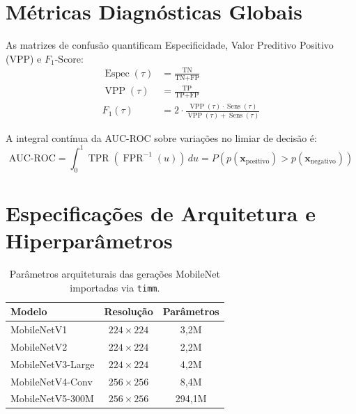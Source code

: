 \documentclass[oneside,english,brazilian]{UNISINOSmonografia}
\begin{document}
\section{Métricas Diagnósticas Globais}
\label{sec:apendice_metricas}

As matrizes de confusão quantificam Especificidade, Valor Preditivo Positivo (VPP) e $F_1$-Score:
\begin{align}
    \operatorname{Espec}(\tau) &= \frac{\text{TN}}{\text{TN} + \text{FP}} \\
    \operatorname{VPP}(\tau) &= \frac{\text{TP}}{\text{TP} + \text{FP}} \\
    F_1(\tau) &= 2 \cdot \frac{\operatorname{VPP}(\tau) \cdot \operatorname{Sens}(\tau)}{\operatorname{VPP}(\tau) + \operatorname{Sens}(\tau)}
\end{align}

A integral contínua da AUC-ROC sobre variações no limiar de decisão é:
\begin{equation}
    \label{eq:apendice_auc_roc}
    \text{AUC-ROC} = \int_{0}^{1} \operatorname{TPR}\left(\operatorname{FPR}^{-1}(u)\right) \, du = P\left(p(\mathbf{x}_{\text{positivo}}) > p(\mathbf{x}_{\text{negativo}})\right)
\end{equation}

\section{Especificações de Arquitetura e Hiperparâmetros}
\label{sec:apendice_tabelas}

\begin{table}[H]
    \centering
    \caption{Parâmetros arquiteturais das gerações MobileNet importadas via \texttt{timm}.}
    \label{tab:apendice_arquiteturas}
    \begin{tabular}{lcc}
        \toprule
        \textbf{Modelo} & \textbf{Resolução} & \textbf{Parâmetros} \\
        \midrule
        MobileNetV1 & $224 \times 224$ & 3,2M \\
        MobileNetV2 & $224 \times 224$ & 2,2M \\
        MobileNetV3-Large & $224 \times 224$ & 4,2M \\
        MobileNetV4-Conv & $256 \times 256$ & 8,4M \\
        MobileNetV5-300M & $256 \times 256$ & 294,1M \\
        \bottomrule
    \end{tabular}
\end{table}
\end{document}
